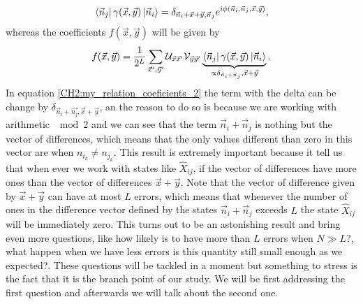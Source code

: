\begin{equation}
\mathinner{\langle{\vec{n}_j}|}\gamma(\vec{x},\vec{y})\mathinner{|{\vec{n}_i}\rangle}=\delta_{\vec{n}_i+\vec{x}+\vec{y},\vec{n}_j}e^{i\phi(\vec{n}_i,\vec{n}_j,\vec{x},\vec{y})},
\label{CH2:my_relation_coeficients_2}
\end{equation}
whereas the coefficients $f(\vec{x},\vec{y})$ will be given by
\begin{equation}
f(\vec{x},\vec{y}) = \frac{1}{2^L}\sum_{\vec{x}',\vec{y}'} \mathcal{U}_{\vec{x}\vec{x}'} \mathcal{V}_{\vec{y}\vec{y}'} \underbrace{\mathinner{\langle{\vec{n}_j}|}\gamma(\vec{x},\vec{y})\mathinner{|{\vec{n}_i}\rangle}}_{\propto \delta_{\vec{n}_i+\vec{n}_j},\vec{x}+\vec{y}}.
\label{CH2:my_Relation_coeffitients_final}
\end{equation}
In equation \eqref{CH2:my_relation_coeficients_2} the term with the delta can be change by $\delta_{\vec{n}_i+\vec{n_j},\vec{x}+\vec{y}}$, an the reason to do so is because we are working with arithmetic $\mod 2$ and we can see that the term $\vec{n}_i+\vec{n}_j$ is nothing but the vector of differences, which means that the only values different than zero in this vector are when $n_{i_k}\neq n_{j_k}$. This result is extremely important because it tell us that when ever we work with states like $\hat{X}_{ij}$, if the vector of differences have more ones than the vector of differences $\vec{x}+\vec{y}$. Note that the vector of difference given by $\vec{x}+\vec{y}$ can have at most $L$ errors, which means that whenever the number of ones in the difference vector defined by the states $\vec{n}_i+\vec{n}_j$ exceeds $L$ the state $\hat{X}_{ij}$ will be immediately zero. This turns out to be an astonishing result and bring even more questions, like how likely is to have more than $L$ errors when $N\gg L$?, what happen when we have less errors is this quantity still small enough as we expected?. These questions will be tackled in a moment but something to stress is the fact that it is the branch point of our study. We will be first addressing the first question and afterwards we will talk about the second one.
